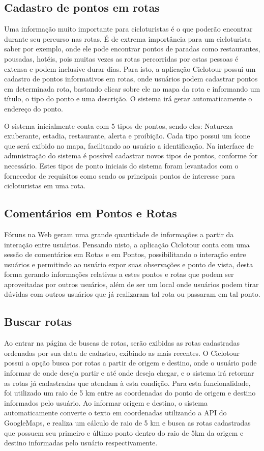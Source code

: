 \subsection{Cadastro de pontos em rotas}
Uma informação muito importante para cicloturistas é o que poderão encontrar durante seu percurso nas rotas. É de extrema importância para um 
cicloturista saber por exemplo, onde ele pode encontrar pontos de paradas como restaurantes, pousadas, hotéis, pois muitas vezes as rotas percorridas
por estas pessoas é extensa e podem inclusive durar dias. Para isto, a aplicação Ciclotour possui um cadastro de pontos informativos em rotas, onde
usuários podem cadastrar pontos em determinada rota, bastando clicar sobre ele no mapa da rota e informando um título, o tipo do ponto e uma 
descrição. O sistema irá gerar automaticamente o endereço do ponto. 

O sistema inicialmente conta com 5 tipos de pontos, sendo eles: Natureza exuberante, estadia, restaurante, alerta e proibição. Cada tipo possui um 
ícone que será exibido no mapa, facilitando ao usuário a identificação. Na interface de admnistração do sistema é possível cadastrar novos tipos de 
pontos, conforme for necessário. Estes tipos de ponto iniciais do sistema foram levantados com o fornecedor de requisitos como sendo os principais 
pontos de interesse para cicloturistas em uma rota.

\subsection{Comentários em Pontos e Rotas}
Fóruns na Web geram uma grande quantidade de informações a partir da interação entre usuários. Pensando nisto, a aplicação Ciclotour conta com uma 
sessão de comentários em Rotas e em Pontos, possibilitando o interação entre usuários e permitindo ao usuário expor suas observações e ponto de 
vista, desta forma gerando informações relativas a estes pontos e rotas que podem ser aproveitadas por outros usuários, além de ser um local onde 
usuários podem tirar dúvidas com outros usuários que já realizaram tal rota ou passaram em tal ponto.

\subsection{Buscar rotas}
Ao entrar na página de buscas de rotas, serão exibidas as rotas cadastradas ordenadas por sua data de cadastro, exibindo as mais recentes.
O Ciclotour possui a opção busca por rotas a partir de origem e destino, onde o usuário pode informar de onde deseja partir e até onde deseja chegar,
e o sistema irá retornar as rotas já cadastradas que atendam à esta condição. Para esta funcionalidade, foi utilizado um raio de 5 km entre as 
coordenadas do ponto de origem e destino informados pelo usuário. Ao informar origem e destino, o sistema automaticamente converte o texto em 
coordenadas utilizando a API do GoogleMaps, e realiza um cálculo de raio de 5 km e busca as rotas cadastradas que possuem seu primeiro e último ponto
dentro do raio de 5km da origem e destino informadas pelo usuário respectivamente.

